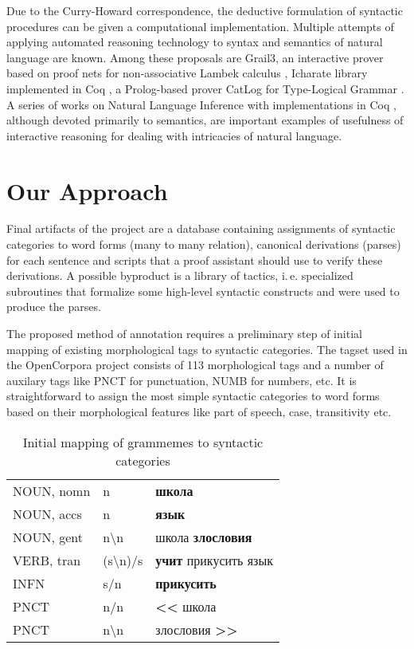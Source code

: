 \documentclass[a4paper]{article}
\theoremstyle{example-style}
\begin{document}
Due to the Curry-Howard correspondence, the deductive formulation of syntactic procedures can be given a computational implementation. Multiple attempts of applying automated reasoning technology to syntax and semantics of natural language are known. Among these proposals are Grail3, an interactive prover based on proof nets for non-associative Lambek calculus \parencite{moot2002proof}, Icharate library implemented in Coq \parencite{anoun2007approche}, a Prolog-based prover CatLog for Type-Logical Grammar \parencite{morrill2012catlog}. A series of works on Natural Language Inference with implementations in Coq \parencite{chatzikyriakidis2014natural}, although devoted primarily to semantics, are important examples of usefulness of interactive reasoning for dealing with intricacies of natural language.


\section{Our Approach}

Final artifacts of the project are a database containing assignments of syntactic categories to word forms (many to many relation), canonical derivations (parses) for each sentence and scripts that a proof assistant should use to verify these derivations. A possible byproduct is a library of tactics, i.\,e. specialized subroutines that formalize some high-level syntactic constructs and were used to produce the parses. 

The proposed method of annotation requires a preliminary step of initial mapping of existing morphological tags to syntactic categories. The tagset used in the OpenCorpora project consists of 113 morphological tags and a number of auxilary tags like PNCT for punctuation, NUMB for numbers, etc. It is straightforward to assign the most simple syntactic categories to word forms based on their morphological features like part of speech, case, transitivity etc.

\begin{table}[ht]
\centering
\caption{Initial mapping of grammemes to syntactic categories}
\label{my-label}
\begin{tabular}{lll}
NOUN, nomn & n         & \textbf{школа}                              \\
NOUN, accs & n         & \textbf{язык}                               \\
NOUN, gent & n\textbackslash n      & школа \textbf{злословия}       \\
VERB, tran & (s\textbackslash n)/s & \textbf{учит} прикусить язык    \\
INFN       & s/n       & \textbf{прикусить}                          \\
PNCT       & n/n       & \textbf{\textless\textless} школа           \\
PNCT       & n\textbackslash n      & злословия \textbf{\textgreater\textgreater} 
\end{tabular}
\end{table}    
  
\end{document}
